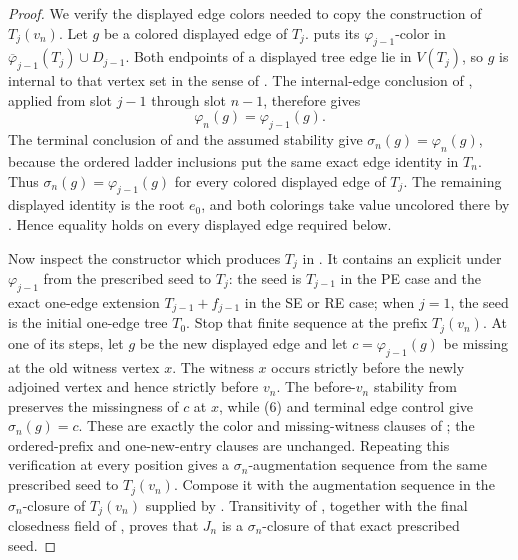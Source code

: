 \begin{proof}
We verify the displayed edge colors needed to copy the construction of
$T_j(v_n)$.  Let $g$ be a colored displayed edge of $T_j$.
 puts its $\varphi_{j-1}$-color in
$\overline\varphi_{j-1}(T_j)\cup D_{j-1}$.  Both endpoints of a
displayed tree edge lie in $V(T_j)$, so $g$ is internal to that vertex
set in the sense of .  The internal-edge conclusion of
, applied from slot $j-1$ through slot
$n-1$, therefore gives
\[
                  \varphi_n(g)=\varphi_{j-1}(g).               \tag{6}
\]
The terminal conclusion of  and the
assumed stability give $\sigma_n(g)=\varphi_n(g)$, because the ordered
ladder inclusions put the same exact edge identity in $T_n$.  Thus
$\sigma_n(g)=\varphi_{j-1}(g)$ for every colored displayed edge of
$T_j$.  The remaining displayed identity is the root $e_0$, and both
colorings take value uncolored there by
.  Hence equality holds on every displayed
edge required below.

Now inspect the constructor which produces $T_j$ in
.  It contains an explicit
 under $\varphi_{j-1}$ from the
prescribed seed to $T_j$: the seed is $T_{j-1}$ in the PE case and the
exact one-edge extension $T_{j-1}+f_{j-1}$ in the SE or RE case; when
$j=1$, the seed is the initial one-edge tree $T_0$.  Stop that finite
sequence at the prefix $T_j(v_n)$.  At one of its steps, let $g$ be the
new displayed edge and let $c=\varphi_{j-1}(g)$ be missing at the old
witness vertex $x$.  The witness $x$ occurs strictly before the newly
adjoined vertex and hence strictly before $v_n$.  The before-$v_n$
stability from  preserves the missingness of
$c$ at $x$, while (6) and terminal edge control give
$\sigma_n(g)=c$.  These are exactly the color and missing-witness clauses
of ; the ordered-prefix and one-new-entry
clauses are unchanged.  Repeating this verification at every position
gives a $\sigma_n$-augmentation sequence from the same prescribed seed
to $T_j(v_n)$.  Compose it with the augmentation sequence in the
$\sigma_n$-closure of $T_j(v_n)$ supplied by
.  Transitivity of
, together with the final
closedness field of , proves that $J_n$ is a
$\sigma_n$-closure of that exact prescribed seed.


\end{proof}
